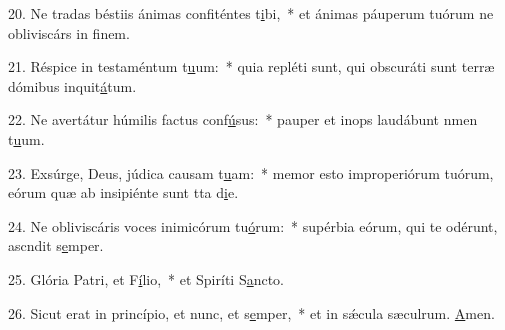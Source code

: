 20. Ne tradas béstiis ánimas confiténtes t\uline{i}bi,~* et ánimas páuperum tuórum ne obliviscárs in f\uline{i}nem.\par 
21. Réspice in testaméntum t\uline{u}um:~* quia repléti sunt, qui obscuráti sunt terræ dómibus inquit\uline{á}tum.\par 
22. Ne avertátur húmilis factus conf\uline{ú}sus:~* pauper et inops laudábunt nmen t\uline{u}um.\par 
23. Exsúrge, Deus, júdica causam t\uline{u}am:~* memor esto improperiórum tuórum, eórum quæ ab insipiénte sunt tta d\uline{i}e.\par 
24. Ne obliviscáris voces inimicórum tu\uline{ó}rum:~* supérbia eórum, qui te odérunt, ascndit s\uline{e}mper.\par 
25. Glória Patri, et F\uline{í}lio,~* et Spiríti S\uline{a}ncto.\par 
26. Sicut erat in princípio, et nunc, et s\uline{e}mper,~* et in sǽcula sæculrum. \uline{A}men.\par 
